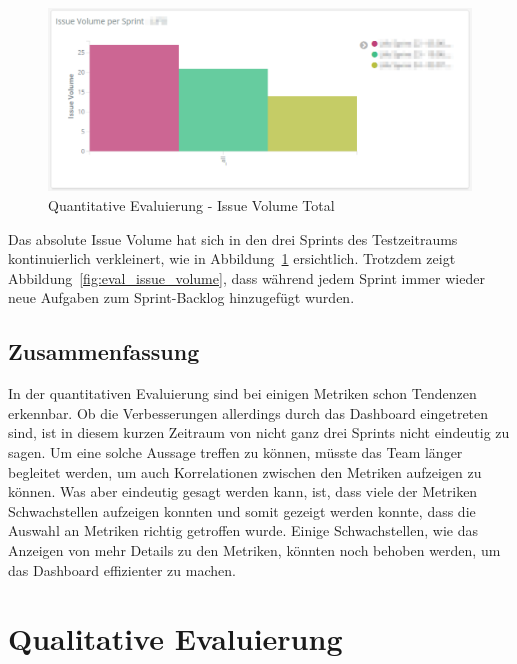 \begin{savenotes}
    \begin{figure}[H]
      \centering
      \includegraphics[width=1.0\textwidth]{img/eval-volume-total.png}
      \caption{Quantitative Evaluierung {-} Issue Volume Total}\label{fig:eval_issue_volume_total}
    \end{figure}
\end{savenotes}

Das absolute Issue Volume hat sich in den drei Sprints des Testzeitraums kontinuierlich verkleinert, wie in Abbildung~\ref{fig:eval_issue_volume_total} ersichtlich.
Trotzdem zeigt Abbildung~\ref{fig:eval_issue_volume}, dass während jedem Sprint immer wieder neue Aufgaben zum Sprint-Backlog hinzugefügt wurden.

\clearpage
\subsection*{Zusammenfassung}

In der quantitativen Evaluierung sind bei einigen Metriken schon Tendenzen erkennbar.
Ob die Verbesserungen allerdings durch das Dashboard eingetreten sind, ist in diesem kurzen Zeitraum von nicht ganz drei Sprints nicht eindeutig zu sagen.
Um eine solche Aussage treffen zu können, müsste das Team länger begleitet werden, um auch Korrelationen zwischen den Metriken aufzeigen zu können.
Was aber eindeutig gesagt werden kann, ist, dass viele der Metriken Schwachstellen aufzeigen konnten und somit gezeigt werden konnte, dass die Auswahl an Metriken richtig getroffen wurde.
Einige Schwachstellen, wie das Anzeigen von mehr Details zu den Metriken, könnten noch behoben werden, um das Dashboard effizienter zu machen.

\clearpage
\section{Qualitative Evaluierung}

